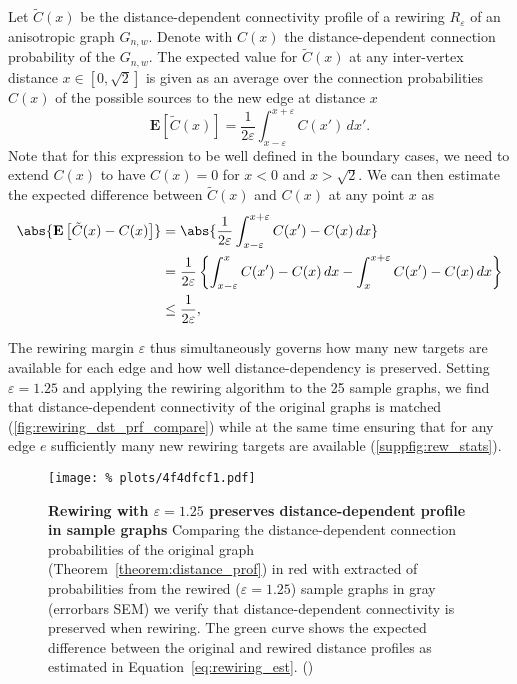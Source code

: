 Let $\tilde{C}(x)$ be the distance-de\-pen\-dent connectivity profile
of a rewiring $R_{\varepsilon}$ of an anisotropic graph
$G_{n,w}$. Denote with $C(x)$ the distance-de\-pen\-dent connection
probability of the $G_{n,w}$. The expected value for $\tilde{C}(x)$ at
any inter-vertex distance $x \in [0,\sqrt{2}]$ is given as an average
over the connection probabilities $C(x)$ of the possible sources to
the new edge at distance $x$
\[
\mathbf{E}\left[\tilde{C}(x)\right] =
  \frac{1}{2\varepsilon}\int_{x-\varepsilon}^{x+\varepsilon} C(x') \,
  dx'.
\]
Note that for this expression to be well defined in the boundary
cases, we need to extend $C(x)$ to have $C(x) = 0$ for $x<0$ and
$x>\sqrt{2}$.  We can then estimate the expected difference between
$\tilde{C}(x)$ and $C(x)$ at any point $x$ as
\begin{align}
  \abs{\mathbf{E}\left[\tilde{C}(x) - C(x)\right]}  
    & = \abs{\frac{1}{2\varepsilon}\int_{x-\varepsilon}^{x+\varepsilon}
        C(x') - C(x) \, dx} \notag\\
    & = \frac{1}{2\varepsilon} \left\{ \int_{x-\varepsilon}^{x} C(x') -
        C(x) \, dx - \int_x^{x+\varepsilon} C(x') - C(x) \, dx
        \right\} \notag\\
    & \leq  \frac{1}{2\varepsilon}, \label{eq:rewiring_est}
\end{align}

The rewiring margin $\varepsilon$ thus simultaneously governs how many
new targets are available for each edge and how well
distance-dependency is preserved. Setting $\varepsilon = 1.25$ 
and applying the rewiring algorithm to the 25 sample graphs, we find
that distance-dependent connectivity of the original graphs is matched
(\autoref{fig:rewiring_dst_prf_compare}) while at the same time
ensuring that for any edge $e$ sufficiently many new rewiring targets
are available (\autoref{suppfig:rew_stats}).

\begin{figure}[H]
  \centering
  \texttt{[image: \%
    plots/4f4dfcf1.pdf]} 
  \captionsetup{skip=0pt}
  \caption{\textbf{Rewiring with \boldmath$\varepsilon = 1.25$
      preserves distance-dependent profile in sample graphs} Comparing
    the distance-dependent connection probabilities of the original
    graph (Theorem~\ref{theorem:distance_prof}) in red with extracted
    of probabilities from the rewired ($\varepsilon = 1.25$) sample
    graphs in gray (errorbars SEM) we verify that distance-dependent
    connectivity is preserved when rewiring. The green curve shows the
    expected difference between the original and rewired
    distance profiles as estimated in
    Equation~\ref{eq:rewiring_est}. ()}
  \label{fig:rewiring_dst_prf_compare}
\end{figure}


